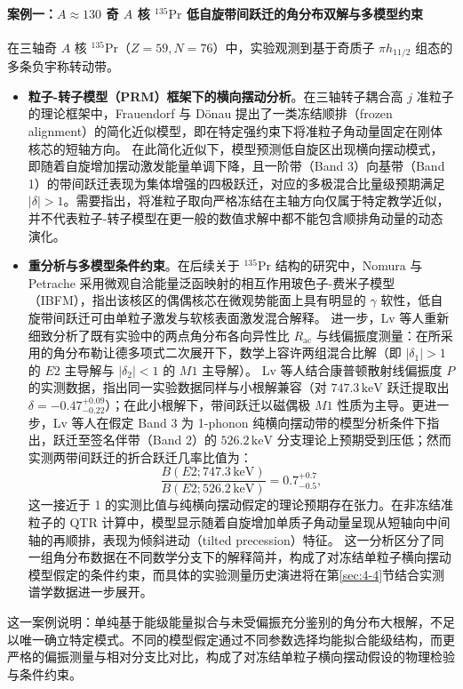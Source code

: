 \paragraph{案例一：$A \approx 130$ 奇 $A$ 核 $^{135}\mathrm{Pr}$ 低自旋带间跃迁的角分布双解与多模型约束}
在三轴奇 $A$ 核 $^{135}\mathrm{Pr}$（$Z=59, N=76$）中，实验观测到基于奇质子 $\pi h_{11/2}$ 组态的多条负宇称转动带。\cite{frauendorf_2014_Transversewobbling,nomura_2022_Questioningwobbling,lv_2022_Evidencewobbling}
\begin{itemize}
\item \textbf{粒子-转子模型（PRM）框架下的横向摆动分析}。在三轴转子耦合高 $j$ 准粒子的理论框架中，Frauendorf 与 Dönau 提出了一类冻结顺排（frozen alignment）的简化近似模型，即在特定强约束下将准粒子角动量固定在刚体核芯的短轴方向。\cite{frauendorf_2014_Transversewobbling} 在此简化近似下，模型预测低自旋区出现横向摆动模式，即随着自旋增加摆动激发能量单调下降，且一阶带（Band 3）向基带（Band 1）的带间跃迁表现为集体增强的四极跃迁，对应的多极混合比量级预期满足 $|\delta| > 1$。需要指出，将准粒子取向严格冻结在主轴方向仅属于特定教学近似，并不代表粒子-转子模型在更一般的数值求解中都不能包含顺排角动量的动态演化。
\item \textbf{重分析与多模型条件约束}。在后续关于 $^{135}\mathrm{Pr}$ 结构的研究中，Nomura 与 Petrache 采用微观自洽能量泛函映射的相互作用玻色子-费米子模型（IBFM），指出该核区的偶偶核芯在微观势能面上具有明显的 $\gamma$ 软性，低自旋带间跃迁可由单粒子激发与软核表面激发混合解释。\cite{nomura_2022_Questioningwobbling} 进一步，Lv 等人重新细致分析了既有实验中的两点角分布各向异性比 $R_{\mathrm{ac}}$ 与线偏振度测量：在所采用的角分布勒让德多项式二次展开下，数学上容许两组混合比解（即 $|\delta_1| > 1$ 的 $E2$ 主导解与 $|\delta_2| < 1$ 的 $M1$ 主导解）。\cite{lv_2022_Evidencewobbling} Lv 等人结合康普顿散射线偏振度 $P$ 的实测数据，指出同一实验数据同样与小根解兼容（对 $747.3\,\mathrm{keV}$ 跃迁提取出 $\delta = -0.47^{+0.09}_{-0.22}$）；在此小根解下，带间跃迁以磁偶极 $M1$ 性质为主导。更进一步，Lv 等人在假定 Band 3 为 1-phonon 纯横向摆动带的模型分析条件下指出，跃迁至签名伴带（Band 2）的 $526.2\,\mathrm{keV}$ 分支理论上预期受到压低；然而实测两带间跃迁的折合跃迁几率比值为：
\begin{equation}\label{eq:2-8-lv-ratio}
\frac{B(E2; 747.3\,\mathrm{keV})}{B(E2; 526.2\,\mathrm{keV})} = 0.7^{+0.7}_{-0.5} ,
\end{equation}
这一接近于 1 的实测比值与纯横向摆动假定的理论预期存在张力。在非冻结准粒子的 QTR 计算中，模型显示随着自旋增加单质子角动量呈现从短轴向中间轴的再顺排，表现为倾斜进动（tilted precession）特征。\cite{lv_2022_Evidencewobbling} 这一分析区分了同一组角分布数据在不同数学分支下的解释简并，构成了对冻结单粒子横向摆动模型假定的条件约束，而具体的实验测量历史演进将在第\ref{sec:4-4}节结合实测谱学数据进一步展开。
\end{itemize}
这一案例说明：单纯基于能级能量拟合与未受偏振充分鉴别的角分布大根解，不足以唯一确立特定模式。不同的模型假定通过不同参数选择均能拟合能级结构，而更严格的偏振测量与相对分支比对比，构成了对冻结单粒子横向摆动假设的物理检验与条件约束。

